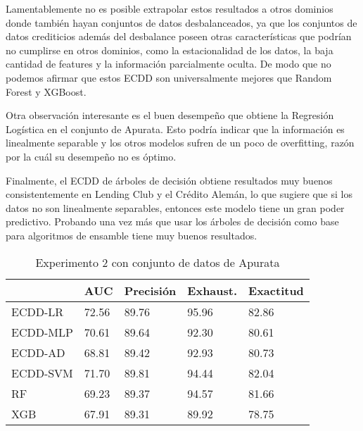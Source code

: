 Lamentablemente no es posible extrapolar estos resultados a otros dominios donde también hayan conjuntos de datos desbalanceados, ya que los conjuntos de datos crediticios además del desbalance poseen otras características que podrían no cumplirse en otros dominios, como la estacionalidad de los datos, la baja cantidad de features y la información parcialmente oculta. De modo que no podemos afirmar que estos \ac{ECDD} son universalmente mejores que Random Forest y XGBoost.

Otra observación interesante es el buen desempeño que obtiene la Regresión Logística en el conjunto de Apurata. Esto podría indicar que la información es linealmente separable y los otros modelos sufren de un poco de overfitting, razón por la cuál su desempeño no es óptimo.

Finalmente, el \ac{ECDD} de árboles de decisión obtiene resultados muy buenos consistentemente en Lending Club y el Crédito Alemán, lo que sugiere que si los datos no son linealmente separables, entonces este modelo tiene un gran poder predictivo. Probando una vez más que usar los árboles de decisión como base para algoritmos de ensamble tiene muy buenos resultados.

\begin{table}[]
\centering
\caption{Experimento 2 con conjunto de datos de Apurata}
\label{tab:apurata-proc2}
\begin{tabularx}{0.75\textwidth}{|l|Y Y Y Y|}
				\hline
				& AUC		& Precisión	& Exhaust.		& Exactitud	\\
				\hline
ECDD-LR			& 72.56		& 89.76		& 95.96			& 82.86		\\		%
ECDD-MLP	 	& 70.61		& 89.64		& 92.30			& 80.61		\\		%
ECDD-AD			& 68.81		& 89.42		& 92.93			& 80.73		\\		%
ECDD-SVM	 	& 71.70		& 89.81		& 94.44			& 82.04		\\		%
				\hline
RF		 		& 69.23		& 89.37		& 94.57			& 81.66		\\		%
XGB				& 67.91		& 89.31		& 89.92			& 78.75		\\		%
				\hline
\end{tabularx}
\end{table}


